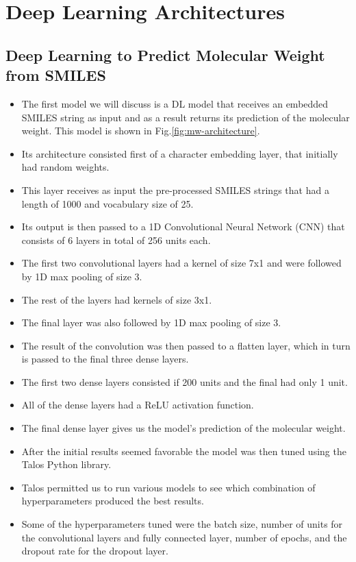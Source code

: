 \section{Deep Learning Architectures \label{archi}}
    \subsection{Deep Learning to Predict Molecular Weight from SMILES}
        \begin{itemize}
            \item The first model we will discuss is a DL model that receives an embedded SMILES string as input and as a result returns its prediction of the molecular weight. This model is shown in Fig.\ref{fig:mw-architecture}.
            \item Its architecture consisted first of a character embedding layer, that initially had random weights.
            \item This layer receives as input the pre-processed SMILES strings that had a length of 1000 and vocabulary size of 25.
            \item Its output is then passed to a 1D Convolutional Neural Network (CNN) that consists of 6 layers in total of 256 units each.
            \item The first two convolutional layers had a kernel of size 7x1 and were followed by 1D max pooling of size 3.
            \item The rest of the layers had kernels of size 3x1.
            \item The final layer was also followed by 1D max pooling of size 3.
            \item The result of the convolution was then passed to a flatten layer, which in turn is passed to the final three dense layers. 
            \item The first two dense layers consisted if 200 units and the final had only 1 unit. 
            \item All of the dense layers had a ReLU activation function.
            \item The final dense layer gives us the model's prediction of the molecular weight.
            \item After the initial results seemed favorable the model was then tuned using the Talos Python library.
            \item Talos permitted us to run various models to see which combination of hyperparameters produced the best results.
            \item Some of the hyperparameters tuned were the batch size, number of units for the convolutional layers and fully connected layer, number of epochs, and the dropout rate for the dropout layer.
        \end{itemize}
